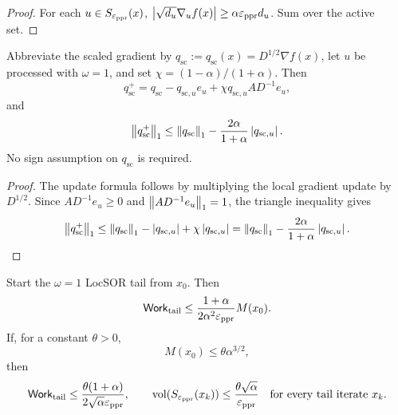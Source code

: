 \begin{proof}
For each \(u\in S_{\varepsilon_{\mathrm{ppr}}}(x)\),
\(
\left\lvert \sqrt{d_u}\nabla_u f(x)\right\rvert\geq\alpha\varepsilon_{\mathrm{ppr}} d_u
\).
Sum over the active set.
\end{proof}

\begin{lemma}
\label{lem:gs-mass-decrease}
Abbreviate the scaled gradient by
\(q_{\mathrm{sc}}:=q_{\mathrm{sc}}(x)=D^{1/2}\nabla f(x)\), let \(u\) be
processed with \(\omega=1\), and set
\(\chi=(1-\alpha)/(1+\alpha)\).  Then
\begin{equation}
    q_{\mathrm{sc}}^+
    =q_{\mathrm{sc}}-q_{\mathrm{sc},u}e_u
     +\chi q_{\mathrm{sc},u}AD^{-1}e_u,
    \label{eq:gs-scaled-update}
\end{equation}
and
\begin{equation}
    \left\lVert q_{\mathrm{sc}}^+\right\rVert_1
    \leq
    \left\lVert q_{\mathrm{sc}}\right\rVert_1
    -\frac{2\alpha}{1+\alpha}\left\lvert q_{\mathrm{sc},u}\right\rvert.
    \label{eq:gs-mass-decrease}
\end{equation}
No sign assumption on \(q_{\mathrm{sc}}\) is required.
\end{lemma}

\begin{proof}
The update formula follows by multiplying the local gradient update by
\(D^{1/2}\).  Since \(AD^{-1}e_u\geq0\) and
\(\left\lVert AD^{-1}e_u\right\rVert_1=1\), the triangle inequality gives
\[
  \left\lVert q_{\mathrm{sc}}^+\right\rVert_1
  \leq
  \left\lVert q_{\mathrm{sc}}\right\rVert_1-\left\lvert q_{\mathrm{sc},u}\right\rvert
  +\chi\left\lvert q_{\mathrm{sc},u}\right\rvert
  =\left\lVert q_{\mathrm{sc}}\right\rVert_1
   -\frac{2\alpha}{1+\alpha}\left\lvert q_{\mathrm{sc},u}\right\rvert.
\]
\end{proof}

\begin{theorem}
\label{thm:mass-handoff}
Start the \(\omega=1\) LocSOR tail from \(x_0\).  Then
\begin{equation}
    \mathsf{Work}_{\rm tail}
    \leq
    \frac{1+\alpha}{2\alpha^2\varepsilon_{\mathrm{ppr}}}M(x_0).
    \label{eq:mass-tail-work}
\end{equation}
If, for a constant \(\theta>0\),
\begin{equation}
    M(x_0)\leq\theta\alpha^{3/2},
    \label{eq:mass-switch-condition}
\end{equation}
then
\begin{equation}
    \mathsf{Work}_{\rm tail}
    \leq
    \frac{\theta(1+\alpha)}{2\sqrt\alpha\varepsilon_{\mathrm{ppr}}},
    \qquad
    \operatorname{vol}(S_{\varepsilon_{\mathrm{ppr}}}(x_k))
    \leq\frac{\theta\sqrt\alpha}{\varepsilon_{\mathrm{ppr}}}
    \quad\text{for every tail iterate }x_k.
    \label{eq:mass-tail-accelerated}
\end{equation}
\end{theorem}


